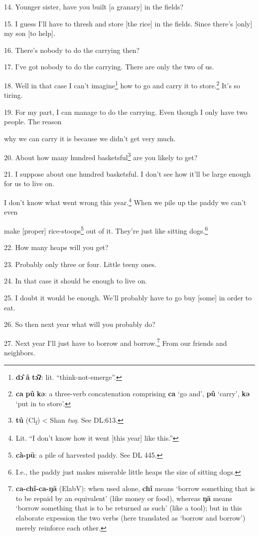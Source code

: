 14. Younger sister, have you built [a granary] in the fields?

15. I guess I'll have to thresh and store [the rice] in the fields. Since there's
[only] my son [to help].

16. There's nobody to do the carrying then?

17. I've got nobody to do the carrying. There are only the two of us.

18. Well in that case I can't imagine\footnote{\textbf{dɔ̂} \textbf{â} \textbf{tɔ̂ʔ}: lit. ``think-not-emerge''.} how to go and carry it to store.\footnote{\textbf{ca} \textbf{pû} \textbf{kə}: a three-verb concatenation comprising \textbf{ca} `go and', \textbf{pû} `carry', \textbf{kə} `put in to store'.}
It's so tiring.

19. For my part, I can manage to do the carrying. Even though I only have two people.
The reason

why we can carry it is because we didn't get very much.

20. About how many hundred basketsful\footnote{\textbf{tû} (Cl\textsubscript{f}) < Shan\textit{ tuŋ}. See DL:613.} are you likely to get?

21. I suppose about one hundred basketsful. I don't see how it'll be large enough
for us to live on.

I don't know what went wrong this year.\footnote{Lit. ``I don't know how it went [this year] like this.''} When we pile up the paddy we can't
even

make [proper] rice-stoops\footnote{\textbf{cà-pū}: a pile of harvested paddy. See DL 445.} out of it. They're just like sitting dogs.\footnote{I.e., the paddy just makes miserable little heaps the size of sitting dogs.}

22. How many heaps will you get?

23. Probably only three or four. Little teeny ones.

24. In that case it should be enough to live on.

25. I doubt it would be enough. We'll probably have to go buy [some] in order to
eat.

26. So then next year what will you probably do?

27. Next year I'll just have to borrow and borrow.\footnote{\textbf{ca-chî-ca-ŋā} (ElabV): when used alone, \textbf{chî} means `borrow something that is to be repaid by an equivalent' (like money or food), whereas \textbf{ŋā} means `borrow something that is to be returned as such' (like a tool); but in this elaborate expession the two verbs (here translated as `borrow and borrow') merely reinforce each other.} From our friends and neighbors.

